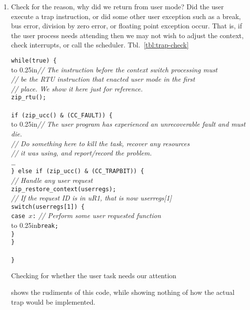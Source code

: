 \documentclass{gqtekspec}
\begin{document}
\begin{enumerate}
\item Check for the reason, why did we return from user mode?  Did the user
	execute a trap instruction, or did some other user exception such as a
	break, bus error, division by zero error, or floating point exception
	occur.  That is, if the user process needs attending then we may not
	wish to adjust the context, check interrupts, or call the scheduler. 
	Tbl.~\ref{tbl:trap-check}
\begin{table}\begin{center}
\begin{tabbing}
{\tt while(true) \{} \\
	\hbox to 0.25in{}\={\em // The instruction before the context switch processing must} \\
\>	{\em // be the RTU instruction that enacted user mode in the first} \\
\>	{\em // place.  We show it here just for reference.} \\
\>	{\tt zip\_rtu();} \\
\\
\>	{\tt if (zip\_ucc() \& (CC\_FAULT)) \{} \\
\>	\hbox to 0.25in{}\={\em // The user program has experienced an unrecoverable fault and must die.}\\
\>\>	{\em // Do something here to kill the task, recover any resources} \\
\>\>		{\em // it was using, and report/record the problem.}\\
\>\>		\ldots \\
\>	{\tt \} else if (zip\_ucc() \& (CC\_TRAPBIT)) \{} \\
\>\>		{\em // Handle any user request} \\
\>\>		{\tt zip\_restore\_context(userregs);} \\
\>\>		{\em // If the request ID is in uR1, that is now userregs[1]}\\
\>\>		{\tt switch(userregs[1]) \{} \\
\>\>		{\tt case $x$:} {\em // Perform some user requested function} \\
\>\>		\hbox to 0.25in{}\= {\tt break;}\\
\>\>		{\tt \}} \\
\>	{\tt \}}\\
\\
{\tt \}}
\end{tabbing}
\caption{Checking for whether the user task needs our attention}\label{tbl:trap-check}
\end{center}\end{table}
	shows the rudiments of this code, while showing nothing of how the
	actual trap would be implemented.
	

\end{enumerate}
\end{document}
